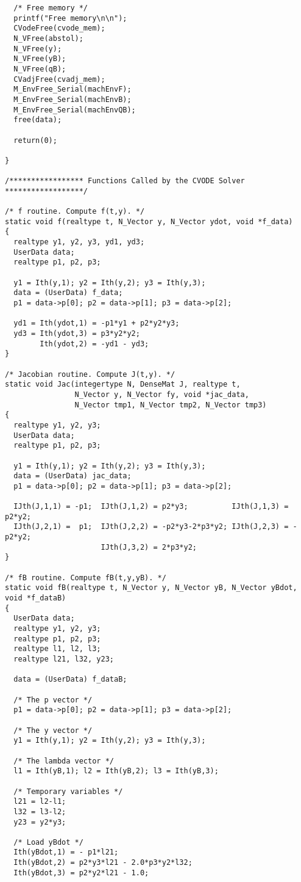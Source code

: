 \begin{verbatim}
  /* Free memory */
  printf("Free memory\n\n");
  CVodeFree(cvode_mem);
  N_VFree(abstol);
  N_VFree(y);
  N_VFree(yB);
  N_VFree(qB);
  CVadjFree(cvadj_mem);
  M_EnvFree_Serial(machEnvF);
  M_EnvFree_Serial(machEnvB);
  M_EnvFree_Serial(machEnvQB);
  free(data);

  return(0);

}

/***************** Functions Called by the CVODE Solver ******************/

/* f routine. Compute f(t,y). */
static void f(realtype t, N_Vector y, N_Vector ydot, void *f_data)
{
  realtype y1, y2, y3, yd1, yd3;
  UserData data;
  realtype p1, p2, p3;

  y1 = Ith(y,1); y2 = Ith(y,2); y3 = Ith(y,3);
  data = (UserData) f_data;
  p1 = data->p[0]; p2 = data->p[1]; p3 = data->p[2];

  yd1 = Ith(ydot,1) = -p1*y1 + p2*y2*y3;
  yd3 = Ith(ydot,3) = p3*y2*y2;
        Ith(ydot,2) = -yd1 - yd3;
}

/* Jacobian routine. Compute J(t,y). */
static void Jac(integertype N, DenseMat J, realtype t,
                N_Vector y, N_Vector fy, void *jac_data, 
                N_Vector tmp1, N_Vector tmp2, N_Vector tmp3)
{
  realtype y1, y2, y3;
  UserData data;
  realtype p1, p2, p3;
 
  y1 = Ith(y,1); y2 = Ith(y,2); y3 = Ith(y,3);
  data = (UserData) jac_data;
  p1 = data->p[0]; p2 = data->p[1]; p3 = data->p[2];
 
  IJth(J,1,1) = -p1;  IJth(J,1,2) = p2*y3;          IJth(J,1,3) = p2*y2;
  IJth(J,2,1) =  p1;  IJth(J,2,2) = -p2*y3-2*p3*y2; IJth(J,2,3) = -p2*y2;
                      IJth(J,3,2) = 2*p3*y2;
}
 
/* fB routine. Compute fB(t,y,yB). */
static void fB(realtype t, N_Vector y, N_Vector yB, N_Vector yBdot, void *f_dataB)
{
  UserData data;
  realtype y1, y2, y3;
  realtype p1, p2, p3;
  realtype l1, l2, l3;
  realtype l21, l32, y23;
  
  data = (UserData) f_dataB;

  /* The p vector */
  p1 = data->p[0]; p2 = data->p[1]; p3 = data->p[2];

  /* The y vector */
  y1 = Ith(y,1); y2 = Ith(y,2); y3 = Ith(y,3);
  
  /* The lambda vector */
  l1 = Ith(yB,1); l2 = Ith(yB,2); l3 = Ith(yB,3);

  /* Temporary variables */
  l21 = l2-l1;
  l32 = l3-l2;
  y23 = y2*y3;

  /* Load yBdot */
  Ith(yBdot,1) = - p1*l21;
  Ith(yBdot,2) = p2*y3*l21 - 2.0*p3*y2*l32;
  Ith(yBdot,3) = p2*y2*l21 - 1.0;



\end{verbatim}
